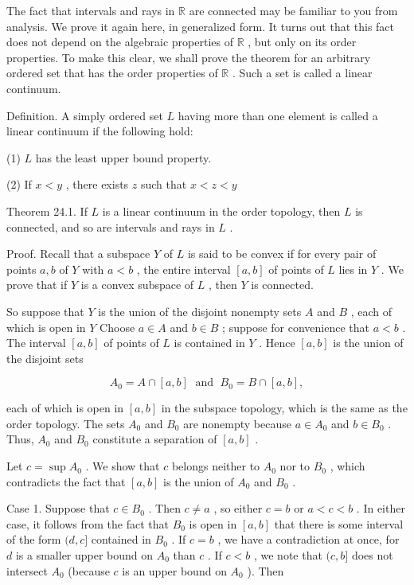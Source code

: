 \documentclass[10pt]{article}
\begin{document}
The fact that intervals and rays in \(\mathbb{R}\) are connected may be familiar to you from analysis. We prove it again here, in generalized form. It turns out that this fact does not depend on the algebraic properties of \(\mathbb{R}\) , but only on its order properties. To make this clear, we shall prove the theorem for an arbitrary ordered set that has the order properties of \(\mathbb{R}\) . Such a set is called a linear continuum.

Definition. A simply ordered set \(L\) having more than one element is called a linear continuum if the following hold:

(1) \(L\) has the least upper bound property.

(2) If \(x < y\) , there exists \(z\) such that \(x < z < y\)

Theorem 24.1. If \(L\) is a linear continuum in the order topology, then \(L\) is connected, and so are intervals and rays in \(L\) .

Proof. Recall that a subspace \(Y\) of \(L\) is said to be convex if for every pair of points \(a,b\) of \(Y\) with \(a < b\) , the entire interval \(\left\lbrack  {a,b}\right\rbrack\) of points of \(L\) lies in \(Y\) . We prove that if \(Y\) is a convex subspace of \(L\) , then \(Y\) is connected.

So suppose that \(Y\) is the union of the disjoint nonempty sets \(A\) and \(B\) , each of which is open in \(Y\) Choose \(a \in  A\) and \(b \in  B\) ; suppose for convenience that \(a < b\) . The interval \(\left\lbrack  {a,b}\right\rbrack\) of points of \(L\) is contained in \(Y\) . Hence \(\left\lbrack  {a,b}\right\rbrack\) is the union of the disjoint sets

\[
{A}_{0} = A \cap  \left\lbrack  {a,b}\right\rbrack  \;\text{ and }\;{B}_{0} = B \cap  \left\lbrack  {a,b}\right\rbrack  ,
\]

each of which is open in \(\left\lbrack  {a,b}\right\rbrack\) in the subspace topology, which is the same as the order topology. The sets \({A}_{0}\) and \({B}_{0}\) are nonempty because \(a \in  {A}_{0}\) and \(b \in  {B}_{0}\) . Thus, \({A}_{0}\) and \({B}_{0}\) constitute a separation of \(\left\lbrack  {a,b}\right\rbrack\) .

Let \(c = \sup {A}_{0}\) . We show that \(c\) belongs neither to \({A}_{0}\) nor to \({B}_{0}\) , which contradicts the fact that \(\left\lbrack  {a,b}\right\rbrack\) is the union of \({A}_{0}\) and \({B}_{0}\) .

Case 1. Suppose that \(c \in  {B}_{0}\) . Then \(c \neq  a\) , so either \(c = b\) or \(a < c < b\) . In either case, it follows from the fact that \({B}_{0}\) is open in \(\left\lbrack  {a,b}\right\rbrack\) that there is some interval of the form \((d,c\rbrack\) contained in \({B}_{0}\) . If \(c = b\) , we have a contradiction at once, for \(d\) is a smaller upper bound on \({A}_{0}\) than \(c\) . If \(c < b\) , we note that \((c,b\rbrack\) does not intersect \({A}_{0}\) (because \(c\) is an upper bound on \({A}_{0}\) ). Then
\end{document}
